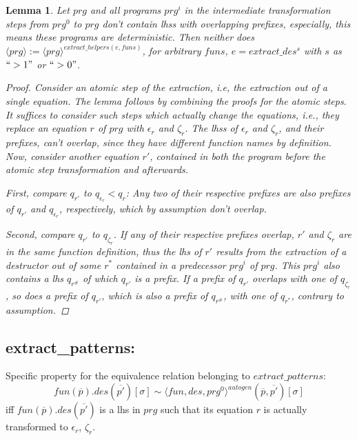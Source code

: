 \documentclass[11pt]{article} %
\newtheorem*{lemma*}{Lemma}
\begin{document}
\begin{lemma*}

Let $prg$ and all programs $prg^i$ in the intermediate transformation steps from $prg^0$ to $prg$ don't contain lhss with overlapping prefixes, especially, this means these programs are deterministic. Then neither does $\langle prg \rangle := \langle prg \rangle^{extract\_helpers(e, funs)}$, for arbitrary $funs$, $e = extract\_des^s$ with $s$ as $`` >1 "$ or $`` >0 "$.

\begin{proof}

Consider an atomic step of the extraction, i.e, the extraction out of a single equation. The lemma follows by combining the proofs for the atomic steps. It suffices to consider such steps which actually change the equations, i.e., they replace an equation $r$ of $prg$ with $\epsilon_r$ and $\zeta_r$. The lhss of $\epsilon_r$ and $\zeta_r$, and their prefixes, can't overlap, since they have different function names by definition. Now, consider another equation $r'$, contained in both the program before the atomic step transformation and afterwards.

First, compare $q_{r'}$ to $q_{\epsilon_r} < q_r$: Any two of their respective prefixes are also prefixes of $q_{r'}$ and $q_{\epsilon_r}$, respectively, which by assumption don't overlap.

Second, compare $q_{r'}$ to $q_{\zeta_r}$. If any of their respective prefixes overlap, $r'$ and $\zeta_r$ are in the same function definition, thus the lhs of $r'$ results from the extraction of a destructor out of some $r^*$ contained in a predecessor $prg^i$ of $prg$. This $prg^i$ also contains a lhs $q_{r^\#}$ of which $q_{r'}$ is a prefix. If a prefix of $q_{r'}$ overlaps with one of $q_{\zeta_r}$, so does a prefix of $q_{r'}$, which is also a prefix of $q_{r^\#}$, with one of $q_{r^*}$, contrary to assumption.

\end{proof}

\end{lemma*}

\subsection*{extract\_patterns:}

Specific property for the equivalence relation belonging to $extract\_patterns$:
\begin{equation*}
fun(\overline{p}).des(\overline{p'})[\sigma] \sim \langle fun, des, prg^0 \rangle^{autogen}(\overline{p}, \overline{p'})[\sigma]
\end{equation*}
iff $fun(\overline{p}).des(\overline{p'})$ is a lhs in $prg$ such that its equation $r$ is actually transformed to $\epsilon_r$, $\zeta_r$.
\end{document}
